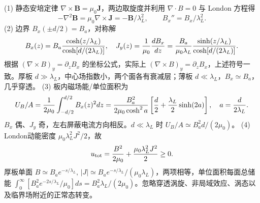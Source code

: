 (1) 静态安培定律 \(\nabla\times\boldsymbol B=\mu_0\boldsymbol J\)，两边取旋度并利用 \(\nabla\cdot B=0\) 与 London 方程得
\[
-\nabla^2\boldsymbol B=\mu_0\nabla\times\boldsymbol J=-\boldsymbol B/\lambda_L^2,
\qquad B_x''=B_x/\lambda_L^2.
\]
(2) 边界 \(B_x(\pm d/2)=B_a\)，对称解
\[
B_x(z)=B_a{\cosh(z/\lambda_L)\over\cosh[d/(2\lambda_L)]},\quad
J_y(z)={1\over\mu_0}{dB_x\over dz}
={B_a\over\mu_0\lambda_L}{\sinh(z/\lambda_L)\over\cosh[d/(2\lambda_L)]}.
\]
根据 \((\nabla\times B)_y=\partial_z B_x\) 的坐标公式，实际上 \((\nabla\times B)_y=\partial_zB_x\)，上述符号一致。厚板 \(d\gg\lambda_L\)，中心场指数小，两个面各有衰减层；薄板 \(d\ll\lambda_L\)，\(B_x\simeq B_a\)，几乎穿透。
(3) 板内磁场能/单位面积为
\[
U_B/A={1\over2\mu_0}\int_{-d/2}^{d/2}B_x(z)^2dz
={B_a^2\over2\mu_0\cosh^2a}
\left[{d\over2}+{\lambda_L\over2}\sinh(2a)\right],
\quad a={d\over2\lambda_L}.
\]
\(B_x\) 偶、\(J_y\) 奇，左右屏蔽电流方向相反。\(d\ll\lambda_L\) 时 \(U_B/A\simeq B_a^2d/(2\mu_0)\)。
(4) London动能密度 \(\mu_0\lambda_L^2J^2/2\)，故
\[
u_\mathrm{tot}={B^2\over2\mu_0}+{\mu_0\lambda_L^2J^2\over2}\ge0.
\]
厚板单面 \(B\simeq B_a e^{-s/\lambda_L},\,|J|\simeq B_a e^{-s/\lambda_L}/(\mu_0\lambda_L)\)，两项相等，单位面积每面总储能 \(\int_0^\infty [B_a^2e^{-2s/\lambda_L}/\mu_0]ds=B_a^2\lambda_L/(2\mu_0)\)。忽略穿透涡旋、非局域效应、涡态以及临界场附近的正常态转变。
